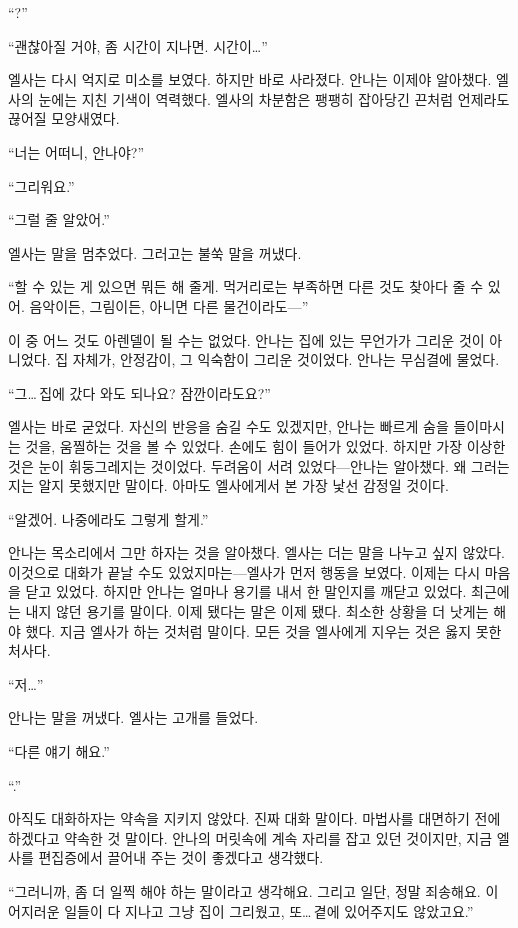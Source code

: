 ``?''

``괜찮아질 거야, 좀 시간이 지나면. 시간이\ldots''

엘사는 다시 억지로 미소를 보였다. 하지만 바로 사라졌다. 안나는 이제야 알아챘다. 엘사의 눈에는 지친 기색이 역력했다. 엘사의 차분함은 팽팽히 잡아당긴 끈처럼 언제라도 끊어질 모양새였다.

``너는 어떠니, 안나야?''

`` 그리워요.''

``그럴 줄 알았어.''

엘사는 말을 멈추었다. 그러고는 불쑥 말을 꺼냈다.

``할 수 있는 게 있으면 뭐든 해 줄게. 먹거리로는 부족하면 다른 것도  찾아다 줄 수 있어. 음악이든, 그림이든, 아니면 다른 물건이라도—''

이 중 어느 것도 아렌델이 될 수는 없었다. 안나는 집에 있는 무언가가 그리운 것이 아니었다. 집 자체가, 안정감이, 그 익숙함이 그리운 것이었다. 안나는 무심결에 물었다.

``그\ldots\,집에 갔다 와도 되나요? 잠깐이라도요?''

엘사는 바로 굳었다. 자신의 반응을 숨길 수도 있겠지만, 안나는 빠르게 숨을 들이마시는 것을, 움찔하는 것을 볼 수 있었다. 손에도 힘이 들어가 있었다. 하지만 가장 이상한 것은 눈이 휘둥그레지는 것이었다. 두려움이 서려 있었다—안나는 알아챘다. 왜 그러는지는 알지 못했지만 말이다. 아마도 엘사에게서 본 가장 낯선 감정일 것이다.

``알겠어. 나중에라도 그렇게 할게.''

안나는 목소리에서 그만 하자는 것을 알아챘다. 엘사는 더는 말을 나누고 싶지 않았다. 이것으로 대화가 끝날 수도 있었지마는—엘사가 먼저 행동을 보였다. 이제는 다시 마음을 닫고 있었다. 하지만 안나는 얼마나 용기를 내서 한 말인지를 깨닫고 있었다. 최근에는 내지 않던 용기를 말이다. 이제 됐다는 말은 이제 됐다. 최소한 상황을 더 낫게는 해야 했다. 지금 엘사가 하는 것처럼 말이다. 모든 것을 엘사에게 지우는 것은 옳지 못한 처사다.

``저\ldots''

안나는 말을 꺼냈다. 엘사는 고개를 들었다.

``다른 얘기 해요.''

``.''

아직도 대화하자는 약속을 지키지 않았다. 진짜 대화 말이다. 마법사를 대면하기 전에 하겠다고 약속한 것 말이다. 안나의 머릿속에 계속 자리를 잡고 있던 것이지만, 지금 엘사를 편집증에서 끌어내 주는 것이 좋겠다고 생각했다.

``그러니까, 좀 더 일찍 해야 하는 말이라고 생각해요. 그리고 일단, 정말 죄송해요. 이 어지러운 일들이 다 지나고 그냥 집이 그리웠고, 또\ldots\,곁에 있어주지도 않았고요.''

